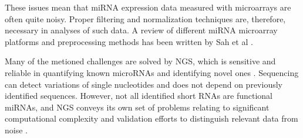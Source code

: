 
These issues mean that miRNA expression data measured with microarrays are often
quite noisy. Proper filtering and normalization techniques are, therefore,
necessary in analyses of such data. A review of different miRNA microarray
platforms and preprocessing methods has been written by Sah et al \citep{Sah2010}.

Many of the metioned challenges are solved by NGS, which is sensitive and
reliable in quantifying known microRNAs and identifying novel ones
\citep{Huang2011}. Sequencing can detect variations of single nucleotides and
does not depend on previously identified sequences. However, not
all identified short RNAs are functional miRNAs, and NGS conveys its own set
of problems relating to significant computational complexity and
validation efforts to distinguish relevant data from noise
\citep{Hunt2015}.
